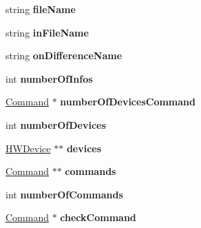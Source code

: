 \begin{DoxyCompactItemize}
\item 
string {\bfseries file\+Name}\hypertarget{classDeviceManager_a744ce0aeda4453860233c6f8b5adb3d4}{}\label{classDeviceManager_a744ce0aeda4453860233c6f8b5adb3d4}

\item 
string {\bfseries in\+File\+Name}\hypertarget{classDeviceManager_a4b4f8ded511116ad9247f9dff8e52276}{}\label{classDeviceManager_a4b4f8ded511116ad9247f9dff8e52276}

\item 
string {\bfseries on\+Difference\+Name}\hypertarget{classDeviceManager_a0ec69b1c6c309a18c35c929a8270de8e}{}\label{classDeviceManager_a0ec69b1c6c309a18c35c929a8270de8e}

\item 
int {\bfseries number\+Of\+Infos}\hypertarget{classDeviceManager_a423e58bd66300388667857304f89f488}{}\label{classDeviceManager_a423e58bd66300388667857304f89f488}

\item 
\hyperlink{classCommand}{Command} $\ast$ {\bfseries number\+Of\+Devices\+Command}\hypertarget{classDeviceManager_a2494b9606c93ee9fb33e32594fa575bf}{}\label{classDeviceManager_a2494b9606c93ee9fb33e32594fa575bf}

\item 
int {\bfseries number\+Of\+Devices}\hypertarget{classDeviceManager_a0d1b28c1d0439fed7c41a15974860697}{}\label{classDeviceManager_a0d1b28c1d0439fed7c41a15974860697}

\item 
\hyperlink{classHWDevice}{H\+W\+Device} $\ast$$\ast$ {\bfseries devices}\hypertarget{classDeviceManager_ac6a7ba09f929d09fbabf60d36db24b2c}{}\label{classDeviceManager_ac6a7ba09f929d09fbabf60d36db24b2c}

\item 
\hyperlink{classCommand}{Command} $\ast$$\ast$ {\bfseries commands}\hypertarget{classDeviceManager_a0f68f691cc8127b0eac36b3e4b2603fd}{}\label{classDeviceManager_a0f68f691cc8127b0eac36b3e4b2603fd}

\item 
int {\bfseries number\+Of\+Commands}\hypertarget{classDeviceManager_a6740c39443b17dc714bebd8b76c201d4}{}\label{classDeviceManager_a6740c39443b17dc714bebd8b76c201d4}

\item 
\hyperlink{classCommand}{Command} $\ast$ {\bfseries check\+Command}\hypertarget{classDeviceManager_abd465cbbacdcfdbe5c91afb365549b92}{}\label{classDeviceManager_abd465cbbacdcfdbe5c91afb365549b92}

\end{DoxyCompactItemize}

